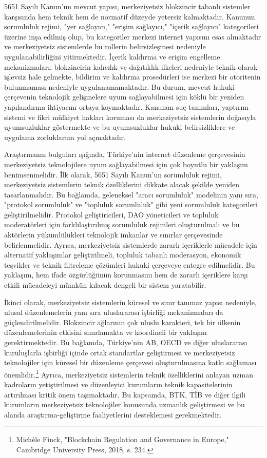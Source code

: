 \documentclass[11pt,a4paper]{article}
\begin{document}
5651 Sayılı Kanun'un mevcut yapısı, merkeziyetsiz blokzincir tabanlı sistemler karşısında hem teknik hem de normatif düzeyde yetersiz kalmaktadır. Kanunun sorumluluk rejimi, "yer sağlayıcı," "erişim sağlayıcı," "içerik sağlayıcı" kategorileri üzerine inşa edilmiş olup, bu kategoriler merkezi internet yapısını esas almaktadır ve merkeziyetsiz sistemlerde bu rollerin belirsizleşmesi nedeniyle uygulanabilirliğini yitirmektedir. İçerik kaldırma ve erişim engelleme mekanizmaları, blokzincirin kalıcılık ve dağıtıklık ilkeleri nedeniyle teknik olarak işlevsiz hale gelmekte, bildirim ve kaldırma prosedürleri ise merkezi bir otoritenin bulunmaması nedeniyle uygulanamamaktadır. Bu durum, mevcut hukuki çerçevenin teknolojik gelişmelere uyum sağlayabilmesi için köklü bir yeniden yapılandırma ihtiyacını ortaya koymaktadır. Kanunun suç tanımları, yaptırım sistemi ve fikri mülkiyet hakları koruması da merkeziyetsiz sistemlerin doğasıyla uyumsuzluklar göstermekte ve bu uyumsuzluklar hukuki belirsizliklere ve uygulama zorluklarına yol açmaktadır.

Araştırmanın bulguları ışığında, Türkiye'nin internet düzenleme çerçevesinin merkeziyetsiz teknolojilere uyum sağlayabilmesi için çok boyutlu bir yaklaşım benimsenmelidir. İlk olarak, 5651 Sayılı Kanun'un sorumluluk rejimi, merkeziyetsiz sistemlerin teknik özelliklerini dikkate alacak şekilde yeniden tasarlanmalıdır. Bu bağlamda, geleneksel "aracı sorumluluk" modelinin yanı sıra, "protokol sorumluluk" ve "topluluk sorumluluk" gibi yeni sorumluluk kategorileri geliştirilmelidir. Protokol geliştiricileri, DAO yöneticileri ve topluluk moderatörleri için farklılaştırılmış sorumluluk rejimleri oluşturulmalı ve bu aktörlerin yükümlülükleri teknolojik imkanlar ve sınırlar çerçevesinde belirlenmelidir. Ayrıca, merkeziyetsiz sistemlerde zararlı içeriklerle mücadele için alternatif yaklaşımlar geliştirilmeli, topluluk tabanlı moderasyon, ekonomik teşvikler ve teknik filtreleme çözümleri hukuki çerçeveye entegre edilmelidir. Bu yaklaşım, hem ifade özgürlüğünün korunmasını hem de zararlı içeriklere karşı etkili mücadeleyi mümkün kılacak dengeli bir sistem yaratabilir.

İkinci olarak, merkeziyetsiz sistemlerin küresel ve sınır tanımaz yapısı nedeniyle, ulusal düzenlemelerin yanı sıra uluslararası işbirliği mekanizmaları da güçlendirilmelidir. Blokzincir ağlarının çok uluslu karakteri, tek bir ülkenin düzenlemelerinin etkisini sınırlamakta ve koordineli bir yaklaşım gerektirmektedir. Bu bağlamda, Türkiye'nin AB, OECD ve diğer uluslararası kuruluşlarla işbirliği içinde ortak standartlar geliştirmesi ve merkeziyetsiz teknolojiler için küresel bir düzenleme çerçevesi oluşturulmasına katkı sağlaması önemlidir.\footnote{Michèle Finck, "Blockchain Regulation and Governance in Europe," Cambridge University Press, 2018, s. 234.} Ayrıca, merkeziyetsiz sistemlerin teknik özelliklerini anlayan uzman kadroların yetiştirilmesi ve düzenleyici kurumların teknik kapasitelerinin artırılması kritik önem taşımaktadır. Bu kapsamda, BTK, TİB ve diğer ilgili kurumların merkeziyetsiz teknolojiler konusunda uzmanlık geliştirmesi ve bu alanda araştırma-geliştirme faaliyetlerini desteklemesi gerekmektedir.
\end{document}
